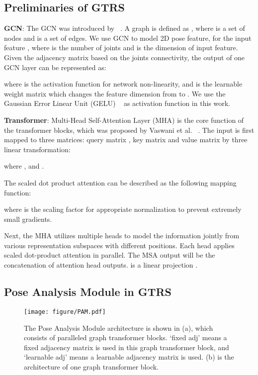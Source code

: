 \documentclass[sigconf]{acmart}
\begin{document}
\subsection{Preliminaries of GTRS} 
\textbf{GCN}: 
The GCN was introduced by ~\cite{kipf2017GCN}. A graph is defined as  , where  is a set of  nodes and  is a set of edges. We use GCN to model 2D pose feature, for the input feature , where  is the number of joints and  is the dimension of input feature. Given the adjacency matrix  based on the joints connectivity, the output  of one GCN layer can be represented as: 

where  is the activation function for network non-linearity, and  is the learnable weight matrix which changes the feature dimension from  to . We use the Gaussian Error Linear Unit (GELU) ~\cite{hendrycks2016gelu} as activation function in this work.  


\noindent\textbf{Transformer}: 
Multi-Head Self-Attention Layer (MHA) is the core function of the transformer blocks, which was proposed by Vaswani et al. ~\cite{vaswani2017attention}. The input  is first mapped to three matrices: query matrix , key matrix  and value matrix  by three linear transformation: 

where ,  and  .

The scaled dot product attention can be described as the following mapping function: 

where  is the scaling factor for appropriate normalization to prevent extremely small gradients. 

Next, the MHA utilizes multiple heads to model the information jointly from various representation subspaces with different positions. Each head applies scaled dot-product attention in parallel. The MSA output will be the concatenation of  attention head outputs.
 is a linear projection .  

\subsection{Pose Analysis Module in GTRS}


\begin{figure}[htp]
\vspace{-5pt}
  \centering
  \texttt{[image: figure/PAM.pdf]}
  \vspace{-10pt}
  \caption{The Pose Analysis Module architecture is shown in (a), which consists of paralleled graph transformer blocks. `fixed adj' means a fixed adjacency matrix is used in this graph transformer block, and `learnable adj' means a learnable adjacency matrix is used. (b) is the architecture of one graph transformer block. }
  \label{fig:PAM}
  \vspace{-5pt}
\end{figure}
\end{document}
